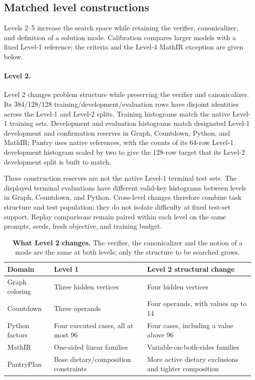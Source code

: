 \documentclass{article}
\newcommand{\1}{\mathbf 1}
\theoremstyle{remark}
\theoremstyle{definition}
\theoremstyle{plain}
\begin{document}
\subsection{Matched level constructions}
\label{app:data-levels}

Levels 2--5 increase the search space while retaining the verifier,
canonicalizer, and definition of a solution mode. Calibration compares larger
models with a fixed Level-1 reference; the criteria and the Level-4 MathIR
exception are given below.

\paragraph{Level 2.}
Level 2 changes problem structure while preserving the verifier and
canonicalizer. Its 384/128/128 training/development/evaluation rows have
disjoint identities across the Level-1 and Level-2 splits. Training histograms
match the native Level-1 training sets. Development and evaluation histograms
match designated Level-1 development and confirmation reserves in Graph,
Countdown, Python, and MathIR; Pantry uses native references, with the counts
of its 64-row Level-1 development histogram scaled by two to give the 128-row
target that its Level-2 development split is built to match.

These construction reserves are not the native Level-1 terminal test sets.
The displayed terminal evaluations have different valid-key histograms
between levels in Graph, Countdown, and Python. Cross-level changes therefore
combine task structure and test population; they do not isolate difficulty
at fixed test-set support. Replay comparisons remain paired within each
level on the same prompts, seeds, fresh objective, and training budget.

\begin{table}[!htbp]
\centering
\caption{\textbf{What Level 2 changes.} The verifier, the canonicalizer and the
notion of a mode are the same at both levels; only the structure to be searched
grows.}
\label{tab:level2-structure}
\small
\begin{tabularx}{.96\linewidth}{@{}lYY@{}}
\toprule
\textbf{Domain} & \textbf{Level 1} & \textbf{Level 2 structural change} \\
\midrule
Graph coloring & Three hidden vertices & Four hidden vertices \\
Countdown & Three operands & Four operands, with values up to 14 \\
Python factors & Four executed cases, all at most 96 & Four cases, including a value above 96 \\
MathIR & One-sided linear families & Variable-on-both-sides families \\
PantryPlan & Base dietary/composition constraints & More active dietary exclusions and tighter composition \\
\bottomrule
\end{tabularx}
\end{table}
\end{document}
